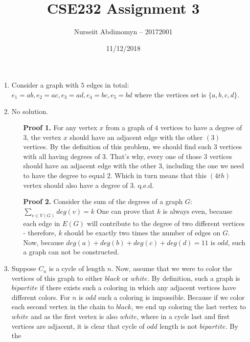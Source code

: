 \documentclass[12pt]{article}
\title{CSE232 Assignment 3}
\author{Nurseiit Abdimomyn -- 20172001}
\date{11/12/2018}
\begin{document}
\maketitle

\begin{enumerate}
  \item
    Consider a graph with $5$ edges in total: \newline
    $e_1 = ab, e_2 = ac, e_3 = ad, e_4 = bc, e_5 = bd$ \newline
    where the vertices set is $\{a, b, c, d\}.$
  \item
    No solution.
    \begin{itemize}
      \item[\textbf{Proof 1.}]
        For any vertex $x$ from a graph of $4$ vertices to have a degree of $3$,
        the vertex $x$ should have an adjacent edge with the other $(3)$ vertices.
        By the definition of this problem, we should find such $3$ vertices with
        all having degrees of $3$. That's why, every one of those $3$ vertices
        should have an adjacent edge with the other $3$, including the one we need
        to have the degree to equal $2$. Which in turn means that this $(4th)$
        vertex should also have a degree of $3$. q.e.d.
      \item[\textbf{Proof 2.}]
        Consider the sum of the degrees of a graph $G$:
        $\sum\limits_{v \in V(G)} deg(v) = k$ \newline
        One can prove that $k$ is always even, because each edge in $E(G)$ 
        will contribute to the degree of two different vertices
        - therefore, $k$ should be exactly two times the number of edges on $G$.
        \newline Now, because $deg(a) + deg(b) + deg(c) + deg(d) = 11$ is $odd$, 
        such a graph can not be constructed.
  \end{itemize}
  \item
    Suppose $C_n$ is a cycle of length $n$. Now, assume
    that we were to color the vertices of this graph to either $black$ or $white$.
    By definition, such a graph is $bipartite$ if there exists such a coloring
    in which any adjacent vertices have different colors. For $n$ is $odd$
    such a coloring is impossible. Because if we color each second vertex in the 
    chain to $black$, we end up coloring the last vertex to $white$ and as the
    first vertex is also $white$, where in a cycle last and first vertices are
    adjacent, it is clear that cycle of $odd$ length is not $bipartite$. By the

\end{enumerate}
\end{document}
